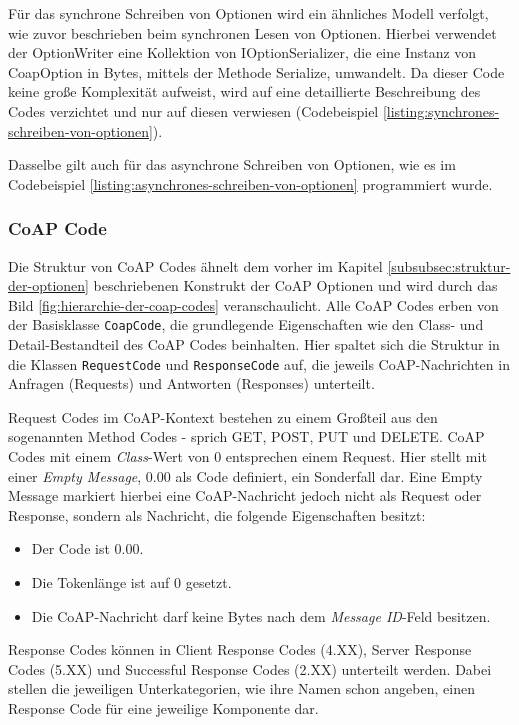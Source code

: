 Für das synchrone Schreiben von Optionen wird ein ähnliches Modell verfolgt, wie zuvor beschrieben beim synchronen Lesen von Optionen. Hierbei verwendet der OptionWriter eine Kollektion von IOptionSerializer, die eine Instanz von CoapOption in Bytes, mittels der Methode Serialize, umwandelt. Da dieser Code keine große Komplexität aufweist, wird auf eine detaillierte Beschreibung des Codes verzichtet und nur auf diesen verwiesen (Codebeispiel \ref{listing:synchrones-schreiben-von-optionen}).

Dasselbe gilt auch für das asynchrone Schreiben von Optionen, wie es im Codebeispiel \ref{listing:asynchrones-schreiben-von-optionen} programmiert wurde.

\subsubsection{CoAP Code}
\label{subsubsec:coap-code}

Die Struktur von CoAP Codes ähnelt dem vorher im Kapitel \ref{subsubsec:struktur-der-optionen} beschriebenen Konstrukt der CoAP Optionen und wird durch das Bild \ref{fig:hierarchie-der-coap-codes} veranschaulicht. Alle CoAP Codes erben von der Basisklasse \texttt{CoapCode}, die grundlegende Eigenschaften wie den Class- und Detail-Bestandteil des CoAP Codes beinhalten. Hier spaltet sich die Struktur in die Klassen \texttt{RequestCode} und \texttt{ResponseCode} auf, die jeweils CoAP-Nachrichten in Anfragen (Requests) und Antworten (Responses) unterteilt.

Request Codes im CoAP-Kontext bestehen zu einem Großteil aus den sogenannten Method Codes - sprich GET, POST, PUT und DELETE. CoAP Codes mit einem \textit{Class}-Wert von 0 entsprechen einem Request. Hier stellt mit einer \textit{Empty Message}, 0.00 als Code definiert, ein Sonderfall dar. Eine Empty Message markiert hierbei eine CoAP-Nachricht jedoch nicht als Request oder Response, sondern als Nachricht, die folgende Eigenschaften besitzt:
\begin{itemize}
    \item Der Code ist 0.00.
    \item Die Tokenlänge ist auf 0 gesetzt.
    \item Die CoAP-Nachricht darf keine Bytes nach dem \textit{Message ID}-Feld besitzen. 
\end{itemize}

Response Codes können in Client Response Codes (4.XX), Server Response Codes (5.XX) und Successful Response Codes (2.XX) unterteilt werden. Dabei stellen die jeweiligen Unterkategorien, wie ihre Namen schon angeben, einen Response Code für eine jeweilige Komponente dar.

